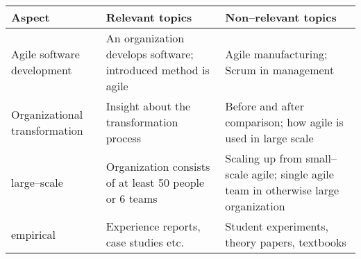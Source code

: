 \centering

 \label{inclusioncriteriatable}
\begin{tabular}{p{10em} p{16em} p{16em}}
	\bfseries{Aspect} & \bfseries{Relevant topics} & \bfseries{Non–relevant topics} \\
	\hline
	Agile software development & An organization develops software; introduced
	method is agile & Agile manufacturing; Scrum in management \\
	Organizational transformation & Insight about the transformation process &
	Before and after comparison; how agile is used in large scale \\
	large–scale & Organization consists of at least 50 people or 6 teams &
	Scaling up from small–scale agile; single agile team in otherwise large
	organization \\
	empirical & Experience reports, case studies etc. & Student experiments,
	theory papers, textbooks \\
\end{tabular}

\justify
